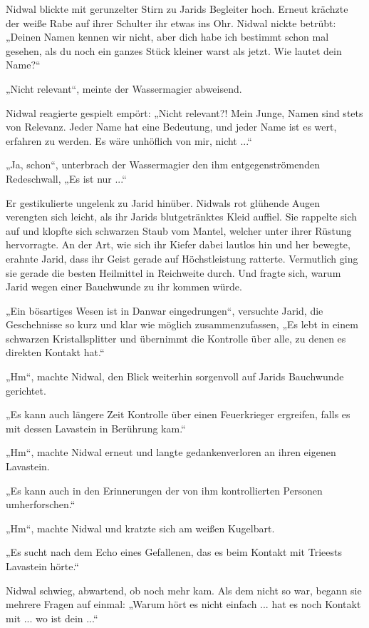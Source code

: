 Nidwal blickte mit gerunzelter Stirn zu Jarids Begleiter hoch. Erneut krächzte der weiße Rabe auf ihrer Schulter ihr etwas ins Ohr. Nidwal nickte betrübt: „Deinen Namen kennen wir nicht, aber dich habe ich bestimmt schon mal gesehen, als du noch ein ganzes Stück kleiner warst als jetzt. Wie lautet dein Name?“

„Nicht relevant“, meinte der Wassermagier abweisend.

Nidwal reagierte gespielt empört: „Nicht relevant?! Mein Junge, Namen sind stets von Relevanz. Jeder Name hat eine Bedeutung, und jeder Name ist es wert, erfahren zu werden. Es wäre unhöflich von mir, nicht ...“

„Ja, schon“, unterbrach der Wassermagier den ihm entgegenströmenden Redeschwall, „Es ist nur ...“

Er gestikulierte ungelenk zu Jarid hinüber. Nidwals rot glühende Augen verengten sich leicht, als ihr Jarids blutgetränktes Kleid auffiel. Sie rappelte sich auf und klopfte sich schwarzen Staub vom Mantel, welcher unter ihrer Rüstung hervorragte. An der Art, wie sich ihr Kiefer dabei lautlos hin und her bewegte, erahnte Jarid, dass ihr Geist gerade auf Höchstleistung ratterte. Vermutlich ging sie gerade die besten Heilmittel in Reichweite durch. Und fragte sich, warum Jarid wegen einer Bauchwunde zu ihr kommen würde.

„Ein bösartiges Wesen ist in Danwar eingedrungen“, versuchte Jarid, die Geschehnisse so kurz und klar wie möglich zusammenzufassen, „Es lebt in einem schwarzen Kristallsplitter und übernimmt die Kontrolle über alle, zu denen es direkten Kontakt hat.“

„Hm“, machte Nidwal, den Blick weiterhin sorgenvoll auf Jarids Bauchwunde gerichtet.

„Es kann auch längere Zeit Kontrolle über einen Feuerkrieger ergreifen, falls es mit dessen Lavastein in Berührung kam.“

„Hm“, machte Nidwal erneut und langte gedankenverloren an ihren eigenen Lavastein.

„Es kann auch in den Erinnerungen der von ihm kontrollierten Personen umherforschen.“

„Hm“, machte Nidwal und kratzte sich am weißen Kugelbart.

„Es sucht nach dem Echo eines Gefallenen, das es beim Kontakt mit Trieests Lavastein hörte.“

Nidwal schwieg, abwartend, ob noch mehr kam. Als dem nicht so war, begann sie mehrere Fragen auf einmal: „Warum hört es nicht einfach ... hat es noch Kontakt mit ... wo ist dein ...“

